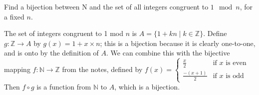 \question Find a bijection between N and the set of all integers 
congruent to $1 \mod n$, for a fixed $n$.
\begin{solution}
The set of integers congruent to 1 mod $n$ is $A = \{1 + kn \mid k \in \mathbb{Z}\}$. 
Define $g : \mathbb{Z} \to A$ by $g(x) = 1 + x \times n$; this is a bijection 
because it is clearly one-to-one, and is onto by the definition of $A$. 
We can combine this with the bijective mapping $f : \mathbb{N} \to \mathbb{Z}$ from the 
notes, defined by
$f(x) = \begin{cases}
\frac{x}{2} & \text{if $x$ is even} \\ 
\frac{-(x + 1)}{2} & \text{if $x$ is odd}
\end{cases}$
Then $f \circ g$ is a function from $\mathbb{N}$ to $A$, which is a bijection.
\end{solution}